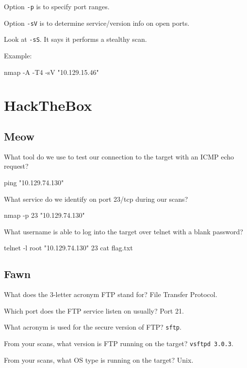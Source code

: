 \documentclass[a4paper,12pt]{article}
\newcommand{\bashinline}[1]{\texttt{#1}}
\begin{document}
\n

Option \bashinline{-p} is to specify port ranges.

\n

Option \bashinline{-sV} is to determine service/version info on open ports.

\n

Look at \bashinline{-sS}. It says it performs a stealthy scan.

Example:
\begin{bash}
nmap -A -T4 -sV "10.129.15.46"
\end{bash}

\pagebreak

\section{HackTheBox}

\subsection{Meow \faLinux}

What tool do we use to test our connection to the target with an ICMP echo request?
\begin{bash}
ping "10.129.74.130"
\end{bash}

What service do we identify on port 23/tcp during our scans?
\begin{bash}
nmap -p 23 "10.129.74.130"
\end{bash}

What username is able to log into the target over telnet with a blank password?
\begin{bash}
telnet -l root "10.129.74.130" 23
cat flag.txt
\end{bash}

\subsection{Fawn \faLinux}

What does the 3-letter acronym FTP stand for? File Transfer Protocol.

Which port does the FTP service listen on usually? Port 21.

What acronym is used for the secure version of FTP? \bashinline{sftp}.

From your scans, what version is FTP running on the target? \bashinline{vsftpd 3.0.3}.

From your scans, what OS type is running on the target? Unix.
\end{document}
